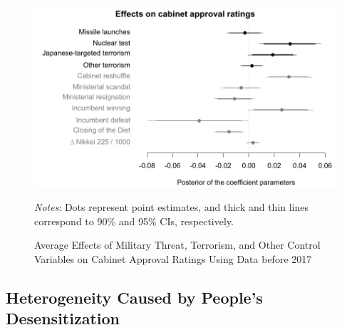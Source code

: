 \documentclass[12pt,letterpaper]{scrartcl}
\begin{document}
\begin{figure}[!ht]
\begin{minipage}{\hsize}
\centering
\singlespacing
\includegraphics[scale=1]{Figure_JCR/analysis_before_2017.pdf}
\caption{Average Effects of Military Threat, Terrorism, and Other Control Variables on Cabinet Approval Ratings Using Data before 2017}
\label{analysis_before_2017}
\end{minipage}
\begin{minipage}{\hsize}
\singlespacing
\small
\emph{Notes}: Dots represent point estimates, and thick and thin lines correspond to 90\% and 95\% CIs, respectively.
\end{minipage}
\end{figure}

\subsection{Heterogeneity Caused by People's Desensitization}\label{app:subsec:desensitization}
\end{document}
